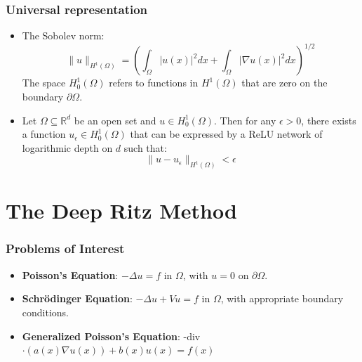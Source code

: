 \documentclass{beamer}
\begin{document}
\begin{frame}
  \frametitle{Universal representation}
  \begin{itemize}
    \item The Sobolev norm:
    $$\|u\|_{H^1(\Omega)} = \left( \int_{\Omega} |u(x)|^2 dx + \int_{\Omega} |\nabla u(x)|^2 dx \right)^{1/2}$$
    The space $H^1_0(\Omega)$ refers to functions in $H^1(\Omega)$ that are zero on the boundary $\partial\Omega$. 
           \item Let $\Omega \subseteq \mathbb{R}^d$ be an open set and $u \in H^1_0(\Omega)$. Then for any $\epsilon > 0$, there exists a function $u_{\epsilon} \in H^1_0(\Omega)$ that can be expressed by a ReLU network of logarithmic depth on $d$ such that:
            $$\|u - u_{\epsilon}\|_{H^1(\Omega)} < \epsilon$$
          \end{itemize}
\end{frame}

\section{The Deep Ritz Method}
\begin{frame}
  \frametitle{Problems of Interest}
      \begin{itemize}
        \item \textbf{Poisson's Equation}: \( -\Delta u = f \) in \( \Omega \), with \( u = 0 \) on \( \partial\Omega \).
        \item \textbf{Schrödinger Equation}: \( -\Delta u + Vu = f \) in \( \Omega \), with appropriate boundary conditions.

        \item \textbf{Generalized Poisson's Equation}: -div$  \cdot \left( a(x) \nabla u(x) \right) + b(x) u(x) = f(x)$

      \end{itemize}
\end{frame}
\end{document}
